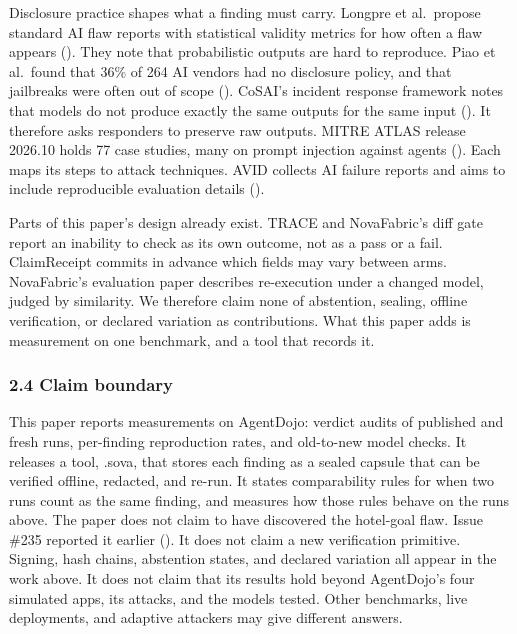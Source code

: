 \documentclass[
  american,
  10pt,
  a4paper,
]{article}
\newcounter{none} %
\begin{document}
Disclosure practice shapes what a finding must carry. Longpre et
al.~propose standard AI flaw reports with statistical validity metrics
for how often a flaw appears (). They note that probabilistic outputs are hard to
reproduce. Piao et al.~found that 36\% of 264 AI vendors had no
disclosure policy, and that jailbreaks were often out of scope
(). CoSAI's incident
response framework notes that models do not produce exactly the same
outputs for the same input (). It therefore asks responders
to preserve raw outputs. MITRE ATLAS release 2026.10 holds 77 case
studies, many on prompt injection against agents
(). Each maps its steps to
attack techniques. AVID collects AI failure reports and aims to include
reproducible evaluation details ().

Parts of this paper's design already exist. TRACE and NovaFabric's diff
gate report an inability to check as its own outcome, not as a pass or a
fail. ClaimReceipt commits in advance which fields may vary between
arms. NovaFabric's evaluation paper describes re-execution under a
changed model, judged by similarity. We therefore claim none of
abstention, sealing, offline verification, or declared variation as
contributions. What this paper adds is measurement on one benchmark, and
a tool that records it.

\subsubsection{2.4 Claim boundary}\label{claim-boundary}

This paper reports measurements on AgentDojo: verdict audits of
published and fresh runs, per-finding reproduction rates, and old-to-new
model checks. It releases a tool, .sova, that stores each finding as a
sealed capsule that can be verified offline, redacted, and re-run. It
states comparability rules for when two runs count as the same finding,
and measures how those rules behave on the runs above. The paper does
not claim to have discovered the hotel-goal flaw. Issue \#235 reported
it earlier (). It
does not claim a new verification primitive. Signing, hash chains,
abstention states, and declared variation all appear in the work above.
It does not claim that its results hold beyond AgentDojo's four
simulated apps, its attacks, and the models tested. Other benchmarks,
live deployments, and adaptive attackers may give different answers.
\end{document}
